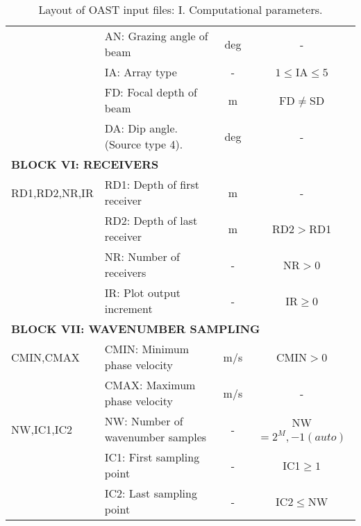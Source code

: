 \begin{table}
\begin{center}
\begin{tabular}{|l|l|c|c|}
	& AN: Grazing angle of beam & deg & - \\
	& IA: Array type & - & $1 \leq $IA$\leq 5$ \\
	& FD: Focal depth of beam & m & FD$\neq$SD \\
        & DA: Dip angle. (Source type 4). & deg & - \\
\hline
\multicolumn{4}{|l|}{\bf BLOCK VI: RECEIVERS} \\
\hline
RD1,RD2,NR,IR & RD1: Depth of first receiver & m & - \\
	& RD2: Depth of last receiver  & m & RD2$>$RD1 \\
	& NR: Number of receivers & - & NR$>0$ \\
	& IR: Plot output increment & - & IR$\geq0$ \\
\hline
\multicolumn{4}{|l|}{\bf BLOCK VII: WAVENUMBER SAMPLING} \\
\hline
CMIN,CMAX & CMIN: Minimum phase velocity & m/s & CMIN$>0$ \\
	& CMAX: Maximum phase velocity & m/s & - \\
NW,IC1,IC2 & NW: Number of wavenumber samples & - & NW$=2^{M}, -1 (auto)$ \\
	& IC1: First sampling point & - & IC1$\geq 1$ \\
	& IC2: Last sampling point & - & IC2$\leq$NW \\
\hline
\end{tabular}
\end{center}
\caption{Layout of OAST input files: I. Computational parameters.
	\label{tab:fipI} }
\end{table} 

